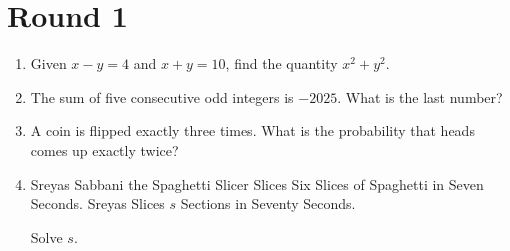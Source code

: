 \documentclass{tufte-handout}
\begin{document}
\section{Round 1}
\begin{enumerate}
    \setlength{\itemsep}{10em}
    \item Given $x-y=4$ and $x+y=10$, find the quantity $x^2+y^2$.
    \item The sum of five consecutive odd integers is $-2025$. What is the last number?
    \item A coin is flipped exactly three times. What is the probability that heads comes up exactly twice?
    \item Sreyas Sabbani the Spaghetti Slicer Slices Six Slices of Spaghetti in Seven Seconds. Sreyas Slices $s$ Sections in Seventy Seconds.
    
    Solve $s$.

\end{enumerate}
\end{document}
